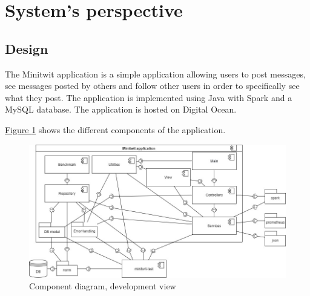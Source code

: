 \section{System's perspective} \label{section:System perspective}
\subsection{Design} %
The Minitwit application is a simple application allowing users to post messages, see messages posted by others and follow other users in order to specifically see what they post. The application is implemented using Java with Spark and a MySQL database. The application is hosted on Digital Ocean.

\hyperref[fig:componentDiagram]{Figure \ref{fig:componentDiagram}} shows the different components of the application.

\begin{figure}[H]
    \centering
    \hspace*{-0.5in}
    \includegraphics[width=1.2\textwidth]{images/Diagrams-Development_view_component_diagram.jpg}
    \caption{Component diagram, development view}
    \label{fig:componentDiagram}
\end{figure}


